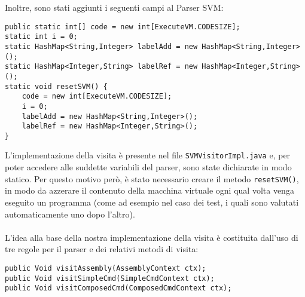 \documentclass[a4paper]{article}   %
\begin{document}
Inoltre, sono stati aggiunti i seguenti campi al Parser SVM:
\begin{lstlisting}[basicstyle=\footnotesize\ttfamily]
public static int[] code = new int[ExecuteVM.CODESIZE];
static int i = 0;
static HashMap<String,Integer> labelAdd = new HashMap<String,Integer>();
static HashMap<Integer,String> labelRef = new HashMap<Integer,String>();
static void resetSVM() {
    code = new int[ExecuteVM.CODESIZE];
    i = 0;
    labelAdd = new HashMap<String,Integer>();
    labelRef = new HashMap<Integer,String>();
}
\end{lstlisting}
L'implementazione della visita è presente nel file \lstinline|SVMVisitorImpl.java| e, per poter accedere alle suddette variabili del parser, sono state dichiarate in modo statico. Per questo motivo però, è stato necessario creare il metodo \lstinline|resetSVM()|, in modo da azzerare il contenuto della macchina virtuale ogni qual volta venga eseguito un programma (come ad esempio nel caso dei test, i quali sono valutati automaticamente uno dopo l'altro).\\\\
L'idea alla base della nostra implementazione della visita è costituita dall'uso di tre regole per il parser e dei relativi metodi di visita:
\begin{lstlisting}[basicstyle=\footnotesize\ttfamily]
public Void visitAssembly(AssemblyContext ctx);
public Void visitSimpleCmd(SimpleCmdContext ctx);
public Void visitComposedCmd(ComposedCmdContext ctx);
\end{lstlisting}
\end{document}
